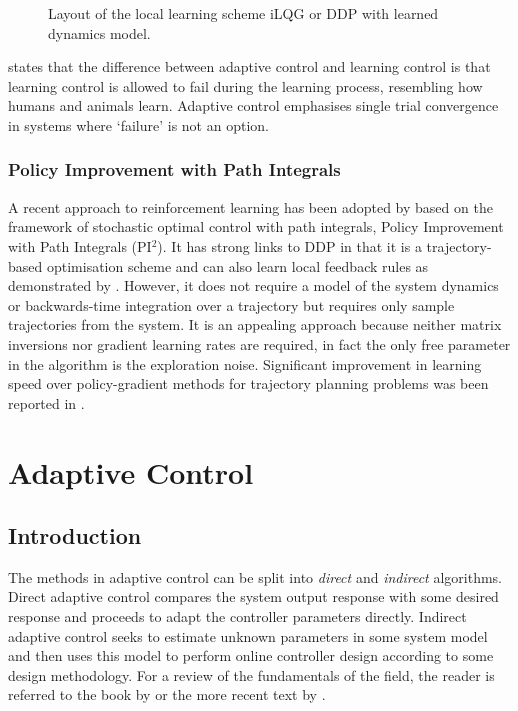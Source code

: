 \begin{figure}
\centering

\caption{Layout of the local learning scheme iLQG or DDP with learned dynamics model.}
\label{figs:iLQGLD}
\end{figure}

\cite{TVS10} states that the difference between adaptive control and learning control is that learning control is allowed to fail during the learning process, resembling how humans and animals learn. Adaptive control emphasises single trial convergence in systems where `failure' is not an option.


\subsubsection{Policy Improvement with Path Integrals}
A recent approach to reinforcement learning has been adopted by \cite{TBS10b} based on the framework of stochastic optimal control with path integrals, Policy Improvement with Path Integrals (PI$^2$). It has strong links to DDP in that it is a trajectory-based optimisation scheme and can also learn local feedback rules as demonstrated by \cite{BSTS11}. However, it does not require a model of the system dynamics or backwards-time integration over a trajectory but requires only sample trajectories from the system. It is an appealing approach because neither matrix inversions nor gradient learning rates are required, in fact the only free parameter in the algorithm is the exploration noise. Significant improvement in learning speed over policy-gradient methods for trajectory planning problems was been reported in \cite{TBS10a}.



\section{Adaptive Control} %
\subsection{Introduction}
The methods in adaptive control can be split into \textit{direct} and \textit{indirect} algorithms. Direct adaptive control compares the system output response with some desired response and proceeds to adapt the controller parameters directly. Indirect adaptive control seeks to estimate unknown parameters in some system model and then uses this model to perform online controller design according to some design methodology. For a review of the fundamentals of the field, the reader is referred to the book by \cite{AsWi94} or the more recent text by \cite{IoFi06}.

